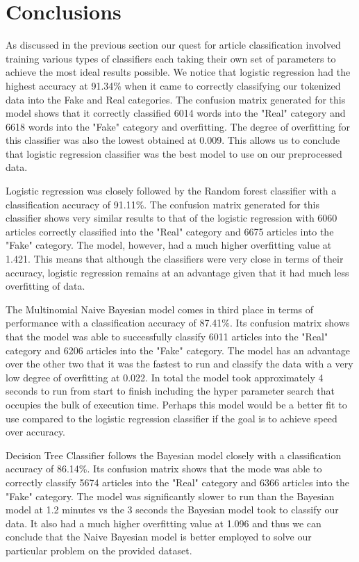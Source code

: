 \documentclass[10pt,twocolumn,letterpaper]{article}
\begin{document}
\section{Conclusions}
\small
As discussed in the previous section our quest for article classification involved training various types of classifiers each taking their own set of parameters to achieve the most ideal results possible. We notice that logistic regression had the highest accuracy at 91.34\% when it came to correctly classifying our tokenized data into the Fake and Real categories. The confusion matrix generated for this model shows that it correctly classified 6014 words into the "Real" category and 6618 words into the "Fake" category and overfitting. The degree of overfitting for this classifier was also the lowest obtained at 0.009. This allows us to conclude that logistic regression classifier was the best model to use on our preprocessed data. \par

Logistic regression was closely followed by the Random forest classifier with a classification accuracy of 91.11\%. The confusion matrix generated for this classifier shows very similar results to that of the logistic regression with 6060 articles correctly classified into the "Real" category and 6675 articles into the "Fake" category. The model, however, had a much higher overfitting value at 1.421. This means that although the classifiers were very close in terms of their accuracy, logistic regression remains at an advantage given that it had much less overfitting of data. \par

The Multinomial Naive Bayesian model comes in third place in terms of performance with a classification accuracy of 87.41\%. Its confusion matrix shows that the model was able to successfully classify 6011 articles into the "Real" category and 6206 articles into the "Fake" category. The model has an advantage over the other two that it was the fastest to run and classify the data with a very low degree of overfitting at 0.022. In total the model took approximately 4 seconds to run from start to finish including the hyper parameter search that occupies the bulk of execution time. Perhaps this model would be a better fit to use compared to the logistic regression classifier if the goal is to achieve speed over accuracy. \par

Decision Tree Classifier follows the Bayesian model closely with a classification accuracy of 86.14\%. Its confusion matrix shows that the mode was able to correctly classify 5674 articles into the "Real" category and 6366 articles into the "Fake" category. The model was significantly slower to run than the Bayesian model at 1.2 minutes vs the 3 seconds the Bayesian model took to classify our data. It also had a much higher overfitting value at 1.096 and thus we can conclude that the Naive Bayesian model is better employed to solve our particular problem on the provided dataset.  \par
\end{document}
